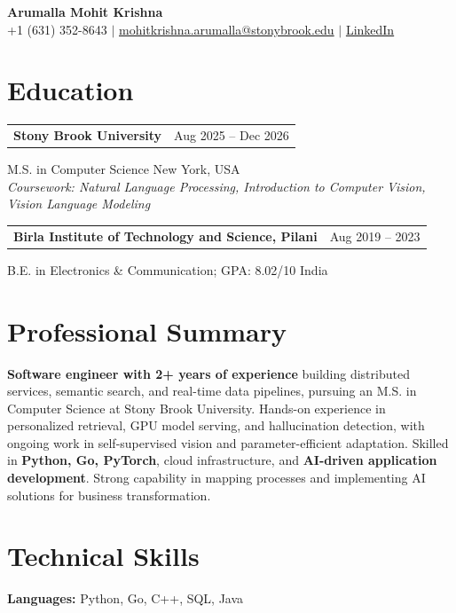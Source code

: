 \documentclass[letterpaper,10pt]{article}
\makeatletter
\newcommand{\entry}[2]{%
  \noindent
  \begin{tabularx}{\linewidth}
    {@{}>{\raggedright\arraybackslash}X@{\hspace{6pt}}r@{}}
    \textbf{#1} & #2
  \end{tabularx}\par
}
\makeatother
\begin{document}
\begin{center}
    {\LARGE\bfseries Arumalla Mohit Krishna}\\[3pt]
    +1 (631) 352-8643 $|$
    \href{mailto:mohitkrishna.arumalla@stonybrook.edu}
    {mohitkrishna.arumalla@stonybrook.edu} $|$
    \href{https://linkedin.com/in/mohit-krishna-arumalla}
    {LinkedIn}
\end{center}
\vspace{-8pt}

\section{Education}

\entry
  {\textbf{Stony Brook University}}
  {Aug 2025 -- Dec 2026}

M.S. in Computer Science \hfill New York, USA\\
\textit{
Coursework: Natural Language Processing,
Introduction to Computer Vision, Vision Language Modeling
}
\vspace{3pt}

\entry
  {\textbf{Birla Institute of Technology and Science, Pilani}}
  {Aug 2019 -- 2023}

B.E. in Electronics \& Communication; GPA: 8.02/10 \hfill India
\section{Professional Summary}

\textbf{Software engineer with 2+ years of experience} building distributed services,
semantic search, and real-time data pipelines, pursuing an M.S. in Computer
Science at Stony Brook University. Hands-on experience in personalized
retrieval, GPU model serving, and hallucination detection, with ongoing work
in self-supervised vision and parameter-efficient adaptation. Skilled in
\textbf{Python, Go, PyTorch}, cloud infrastructure, and \textbf{AI-driven application development}.
Strong capability in mapping processes and implementing AI solutions for business transformation.

\section{Technical Skills}

\textbf{Languages:} Python, Go, C++, SQL, Java\\
\end{document}
